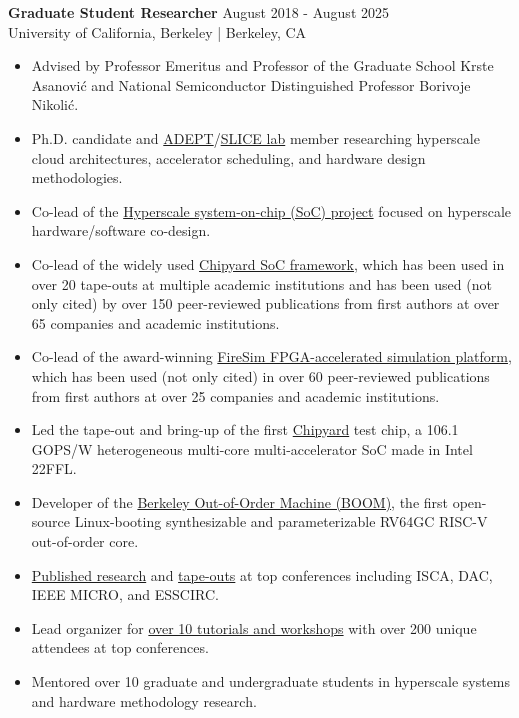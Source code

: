 \documentclass[line]{res}
\begin{document}
\begin{resume}
\textbf{Graduate Student Researcher} \hfill August 2018 - August 2025
\\
University of California, Berkeley | Berkeley, CA
\\
\vspace{-3mm}
\begin{itemize}
\item Advised by Professor Emeritus and Professor of the Graduate School Krste Asanovi\'c and National Semiconductor Distinguished Professor Borivoje Nikoli\'c.
\item Ph.D. candidate and \href{https://adept.eecs.berkeley.edu/}{ADEPT}/\href{https://slice.eecs.berkeley.edu/}{SLICE lab} member researching hyperscale cloud architectures, accelerator scheduling, and hardware design methodologies.
\item Co-lead of the \hyperref[sec:hyperscale-soc]{Hyperscale system-on-chip (SoC) project} focused on hyperscale hardware/software co-design.
\item Co-lead of the widely used \hyperref[sec:chipyard]{Chipyard SoC framework}, which has been used in over 20 tape-outs at multiple academic institutions and has been used (not only cited) by over 150 peer-reviewed publications from first authors at over 65 companies and academic institutions.
\item Co-lead of the award-winning \hyperref[sec:firesim]{FireSim FPGA-accelerated simulation platform}, which has been used (not only cited) in over 60 peer-reviewed publications from first authors at over 25 companies and academic institutions.
\item Led the tape-out and bring-up of the first \hyperref[sec:chipyard]{Chipyard} test chip, a 106.1 GOPS/W heterogeneous multi-core multi-accelerator SoC made in Intel 22FFL.
\item Developer of the \hyperref[sec:boom]{Berkeley Out-of-Order Machine (BOOM)}, the first open-source Linux-booting synthesizable and parameterizable RV64GC RISC-V out-of-order core.
\item \hyperref[sec:pubs]{Published research} and \hyperref[sec:beagle]{tape-outs} at top conferences including ISCA, DAC, IEEE MICRO, and ESSCIRC.
\item Lead organizer for \hyperref[sec:tutorialsworkshops]{over 10 tutorials and workshops} with over 200 unique attendees at top conferences.
\item Mentored over 10 graduate and undergraduate students in hyperscale systems and hardware methodology research.
\end{itemize}


\end{resume}
\end{document}
